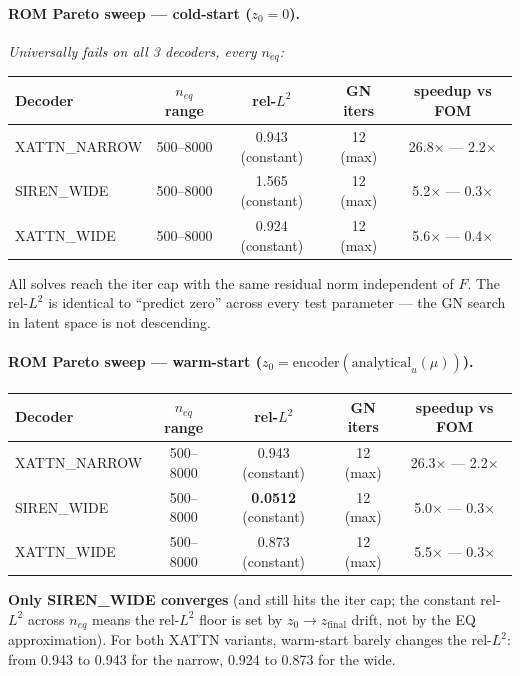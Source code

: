 \documentclass[11pt]{article}
\begin{document}
\paragraph{ROM Pareto sweep --- cold-start ($z_0 = 0$).}
\textit{Universally fails on all 3 decoders, every $n_{eq}$:}
\begin{center}
\begin{tabular}{lcccc}
\toprule
Decoder & $n_{eq}$ range & rel-$L^2$ & GN iters & speedup vs FOM \\
\midrule
XATTN\_NARROW & 500--8000 & 0.943 (constant) & 12 (max) & 26.8$\times$ --- 2.2$\times$ \\
SIREN\_WIDE   & 500--8000 & 1.565 (constant) & 12 (max) & 5.2$\times$ --- 0.3$\times$ \\
XATTN\_WIDE   & 500--8000 & 0.924 (constant) & 12 (max) & 5.6$\times$ --- 0.4$\times$ \\
\bottomrule
\end{tabular}
\end{center}
All solves reach the iter cap with the same residual norm independent
of $F$. The rel-$L^2$ is identical to ``predict zero'' across every test
parameter --- the GN search in latent space is not descending.

\paragraph{ROM Pareto sweep --- warm-start ($z_0 = \text{encoder}(\text{analytical}_u(\mu))$).}
\begin{center}
\begin{tabular}{lcccc}
\toprule
Decoder & $n_{eq}$ range & rel-$L^2$ & GN iters & speedup vs FOM \\
\midrule
XATTN\_NARROW & 500--8000 & 0.943 (constant) & 12 (max) & 26.3$\times$ --- 2.2$\times$ \\
SIREN\_WIDE   & 500--8000 & \textbf{0.0512} (constant) & 12 (max) & 5.0$\times$ --- 0.3$\times$ \\
XATTN\_WIDE   & 500--8000 & 0.873 (constant) & 12 (max) & 5.5$\times$ --- 0.3$\times$ \\
\bottomrule
\end{tabular}
\end{center}

\textbf{Only SIREN\_WIDE converges} (and still hits the iter cap; the
constant rel-$L^2$ across $n_{eq}$ means the rel-$L^2$ floor is set by
$z_0 \to z_{\text{final}}$ drift, not by the EQ approximation). For
both XATTN variants, warm-start barely changes the rel-$L^2$: from
0.943 to 0.943 for the narrow, 0.924 to 0.873 for the wide.
\end{document}
